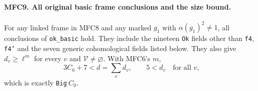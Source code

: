 \documentclass[11pt,a4paper]{article}
\numberwithin{equation}{section}
\theoremstyle{remark}\newtheorem{remark}[theorem]{Remark}
\begin{document}
\paragraph{MFC9. All original basic frame conclusions and the size bound.}
\label{claim:MFC9}
For any linked frame in MFC8 and any marked
\(g_1\) with \(\alpha(g_1)^2\ne1\), all conclusions of
\texttt{ok\_\allowbreak basic} hold.  They include the nineteen
\texttt{Ok} fields other than \texttt{f4}, \texttt{f4'}
and the seven generic cohomological fields listed below.
They also give \(d_v\ge\ell^m\) for every \(v\) and
\(\mathcal V\ne\varnothing\).  With MFC6's \(m\),
\[
       3C_0+7<d=\sum_vd_v,\qquad5<d_v\quad\text{for all }v,
                                                               \tag{MFC.23}
\]
which is exactly \texttt{Big}\(\ C_0\).
\end{document}
